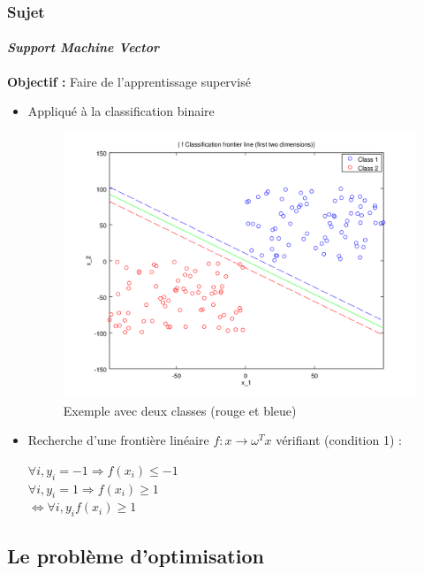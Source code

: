 \documentclass{beamer}
\begin{document}
\begin{frame}
\frametitle{Sujet}
\framesubtitle{\emph{Support Machine Vector}}

\begin{center}
\textbf{Objectif :} Faire de l'apprentissage supervisé
\end{center}

\begin{itemize}
\item Appliqué à la classification binaire

         \begin{figure}
         \centering
         \caption{Exemple avec deux classes (rouge et bleue)}
         \includegraphics[scale=0.3]{images/voronoi.png}
         \end{figure}

\item Recherche d'une frontière linéaire $f : x \rightarrow \omega^Tx$ vérifiant (condition 1) :

         \begin{center}
         $\forall i, y_i = -1 \Rightarrow f(x_i) \leq -1$\\
         $\forall i, y_i = 1 \Rightarrow f(x_i) \geq 1$\\
         $\Leftrightarrow \forall i, y_i f(x_i) \geq 1$
         \end{center}
\end{itemize}

\end{frame}

\subsection{Le problème d'optimisation}
\end{document}
